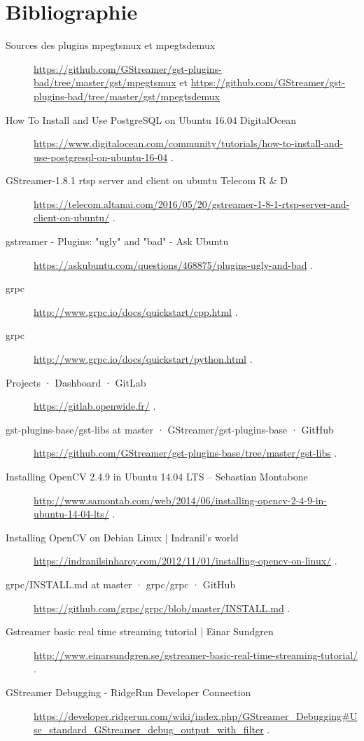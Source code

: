 \chapter*{Bibliographie}

\begin{description} 

\item [Sources des plugins mpegtsmux et mpegtsdemux] \url{https://github.com/GStreamer/gst-plugins-bad/tree/master/gst/mpegtsmux} et \url{https://github.com/GStreamer/gst-plugins-bad/tree/master/gst/mpegtsdemux}

\item [How To Install and Use PostgreSQL on Ubuntu 16.04 DigitalOcean] \url{https://www.digitalocean.com/community/tutorials/how-to-install-and-use-postgresql-on-ubuntu-16-04} . 
\item [GStreamer-1.8.1 rtsp server and client on ubuntu Telecom R \& D] \url{https://telecom.altanai.com/2016/05/20/gstreamer-1-8-1-rtsp-server-and-client-on-ubuntu/} . 
\item [gstreamer - Plugins: "ugly" and "bad" - Ask Ubuntu] \url{https://askubuntu.com/questions/468875/plugins-ugly-and-bad} . 
\item [grpc] \url{http://www.grpc.io/docs/quickstart/cpp.html} . 
\item [grpc] \url{http://www.grpc.io/docs/quickstart/python.html} . 
\item [Projects · Dashboard · GitLab] \url{https://gitlab.openwide.fr/} . 
\item [gst-plugins-base/gst-libs at master · GStreamer/gst-plugins-base · GitHub] \url{https://github.com/GStreamer/gst-plugins-base/tree/master/gst-libs} . 
\item [Installing OpenCV 2.4.9 in Ubuntu 14.04 LTS – Sebastian Montabone] \url{http://www.samontab.com/web/2014/06/installing-opencv-2-4-9-in-ubuntu-14-04-lts/} . 
\item [Installing OpenCV on Debian Linux | Indranil's world] \url{https://indranilsinharoy.com/2012/11/01/installing-opencv-on-linux/} . 
\item [grpc/INSTALL.md at master · grpc/grpc · GitHub] \url{https://github.com/grpc/grpc/blob/master/INSTALL.md} . 
\item [Gstreamer basic real time streaming tutorial | Einar Sundgren] \url{http://www.einarsundgren.se/gstreamer-basic-real-time-streaming-tutorial/} . 
\item [GStreamer Debugging - RidgeRun Developer Connection] \url{https://developer.ridgerun.com/wiki/index.php/GStreamer_Debugging#Use_standard_GStreamer_debug_output_with_filter} . 

\end{description}
